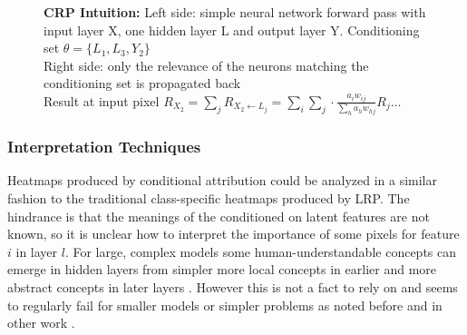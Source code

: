 \begin{figure}[htbp]

    \caption[CRP Intuition]{\textbf{CRP Intuition:} Left side: simple neural network forward pass with input layer X, one hidden layer L and output layer Y. Conditioning set $\theta = \{L_1, L_3, Y_2\}$ \\ Right side: only the relevance of the neurons matching the conditioning set is propagated back \\
        Result at input pixel $R_{X_2} = \sum_{j}  R_{X_2 \gets L_j} =  \sum_i \sum_{j} \cdot \frac{a_i w_{ij}}{\sum_h a_h w_{hj}} R_j \dots$ }
    \label{fig:crp_example_condition}
\end{figure}

\subsubsection{Interpretation Techniques}

Heatmaps produced by conditional attribution could be analyzed in a similar fashion to the traditional class-specific heatmaps produced by LRP. The hindrance is that the meanings of the conditioned on latent features are not known, so it is unclear how to interpret the importance of some pixels for feature $i$ in layer $l$. For large, complex models some human-understandable concepts can emerge in hidden layers from simpler more local concepts in earlier and more abstract concepts in later layers \cite{Bau2017, Hohman2020, Olah2017, Bau2020}. However this is not a fact to rely on and seems to regularly fail for smaller models or simpler problems as noted before and in other work .

